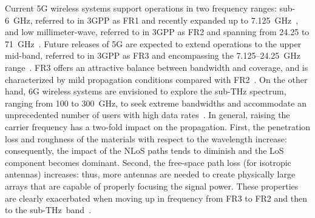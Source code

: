 \documentclass[journal,twocolumn]{IEEEtran}
\begin{document}
Current \ac{5G} wireless systems support operations in two frequency ranges: sub-6~GHz, referred to in \ac{3GPP} as FR1 and recently expanded up to 7.125~GHz~\cite{3GPP_38.101-1}, and low millimeter-wave, referred to in \ac{3GPP} as FR2 and spanning from 24.25 to 71~GHz~\cite{3GPP_38.101-2}. Future releases of \ac{5G} are expected to extend operations to the upper mid-band, referred to in \ac{3GPP} as FR3 and encompassing the 7.125--24.25~GHz range~\cite{3GPP_38.820}. FR3 offers an attractive balance between bandwidth and coverage, and is characterized by mild propagation conditions compared with FR2~\cite{Kan24}. On the other hand, \ac{6G} wireless systems are envisioned to explore the sub-THz spectrum, ranging from 100 to 300~GHz, to seek extreme bandwidths and accommodate an unprecedented number of users with high data rates~\cite{Raj20}. In general, raising the carrier frequency has a two-fold impact on the propagation. First, the penetration loss and roughness of the materials with respect to the wavelength increase: consequently, the impact of the \ac{NLoS} paths tends to diminish and the \ac{LoS} component becomes dominant. Second, the free-space path loss (for isotropic antennas) increases: thus, more antennas are needed to create physically large arrays that are capable of properly focusing the signal power. These properties are clearly exacerbated when moving up in frequency from FR3 to FR2 and then to the sub-THz~band~\cite{Han22}.
\end{document}
